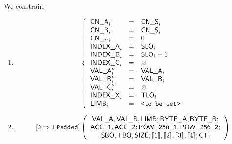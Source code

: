 \begin{center}
\end{center}

We constrain:
\begin{enumerate}
	\item 
\[
	\left\{ \begin{array}{lclr}
		\cnA      _{i}       & = & \cnS_{i}      \\
		\cnB      _{i}       & = & \cnS_{i}      \\
		\cnC      _{i}       & = & 0             \\
		\indexA   _{i}       & = & \slo_{i}      \\
		\indexB   _{i}       & = & \slo_{i}+1    \\
		\indexC   _{i}       & = & \nothing      \\
		\valA     _{i}\new{} & = & \valA_{i}     \\
		\valB     _{i}\new{} & = & \valB_{i}     \\
		\valC     _{i}\new{} & = & \nothing      \\
		\indexX   _{i}       & = & \tlo_{i}      \\
		\limb     _{i}       & = & \valueToBeSet \\
	\end{array} \right.
\]
	\item 
\[
	\twoToOnePadded
	\left( \begin{array}{c}
	\valA{}, \valB{}, \limb{}; \BYTEA{}, \BYTEB{};\\
	\acc{1}, \acc{2}; \pow{1}, \pow{2};\\
	\sbo{}, \tbo{}, \size{}; \bit{1}, \bit{2}, \bit{3}, \bit{4}; \ct{};
	\end{array} \right)
\]
\end{enumerate}
